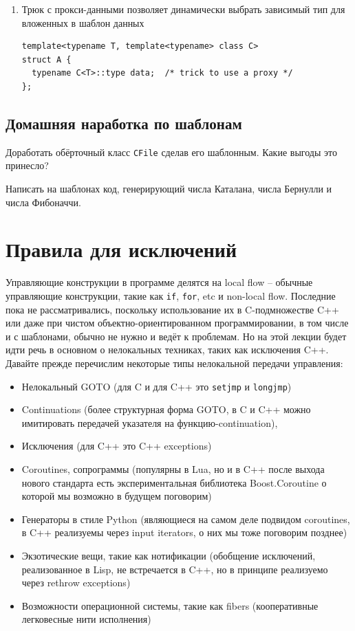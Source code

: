 \documentclass[a4paper,12pt,oneside]{article}
\begin{document}
\begin{enumerate}
\item
Трюк с прокси-данными позволяет динамически выбрать зависимый тип для вложенных в шаблон данных

\begin{lstlisting}
template<typename T, template<typename> class C>
struct A {
  typename C<T>::type data;  /* trick to use a proxy */
};
\end{lstlisting}
\end{enumerate}

\subsection{Домашняя наработка по шаблонам}

Доработать обёрточный класс \lstinline!CFile! сделав его шаблонным. Какие выгоды это принесло? 

Написать на шаблонах код, генерирующий числа Каталана, числа Бернулли и числа Фибоначчи. 

\pagebreak
\section{Правила для исключений}

Управляющие конструкции в программе делятся на local flow -- обычные управляющие конструкции, такие как \lstinline!if!, \lstinline!for!, etc и non-local flow. Последние пока не рассматривались, поскольку использование их в C-подмножестве C++ или даже при чистом объектно-ориентированном программировании, в том числе и с шаблонами, обычно не нужно и ведёт к проблемам. Но на этой лекции будет идти речь в основном о нелокальных техниках, таких как исключения C++. Давайте прежде перечислим некоторые типы нелокальной передачи управления:

\begin{itemize}
\item
Нелокальный GOTO (для C и для C++ это \lstinline!setjmp! и \lstinline!longjmp!)
\item
Continuations (более структурная форма GOTO, в C и C++ можно имитировать передачей указателя на функцию-continuation), 
\item
Исключения (для C++ это C++ exceptions)
\item
Coroutines, сопрограммы (популярны в Lua, но и в C++ после выхода нового стандарта есть экспериментальная библиотека Boost.Coroutine о которой мы возможно в будущем поговорим)
\item
Генераторы в стиле Python (являющиеся на самом деле подвидом coroutines, в C++ реализуемы через input iterators, о них мы тоже поговорим позднее)
\item
Экзотические вещи, такие как нотификации (обобщение исключений, реализованное в Lisp, не встречается в C++, но в принципе реализуемо через rethrow exceptions)
\item
Возможности операционной системы, такие как fibers (кооперативные легковесные нити исполнения)
\end{itemize}
\end{document}
